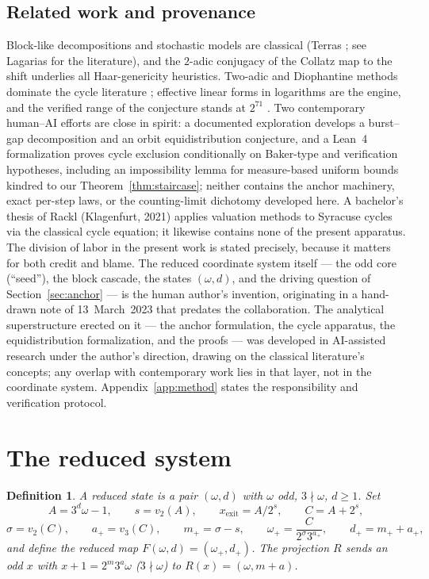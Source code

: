 \documentclass[11pt]{article}
\newtheorem{definition}[theorem]{Definition}
\theoremstyle{remark}
\newcommand{\vt}[1]{v_2\!\left(#1\right)}
\newcommand{\vth}[1]{v_3\!\left(#1\right)}
\newcommand{\w}{\omega}
\newcommand{\wnext}{\w_{+}}
\newcommand{\dnext}{d_{+}}
\begin{document}
\subsection*{Related work and provenance}
Block-like decompositions and stochastic models are classical (Terras \cite{terras}; see Lagarias \cite{lagarias} for the literature), and the $2$-adic conjugacy of the Collatz map to the shift underlies all Haar-genericity heuristics. Two-adic and Diophantine methods dominate the cycle literature \cite{steiner,sdw,hercher,eliahou}; effective linear forms in logarithms \cite{yu,bl,rhin} are the engine, and the verified range of the conjecture stands at $2^{71}$ \cite{barina}. Two contemporary human--AI efforts are close in spirit: a documented exploration \cite{llmcollatz} develops a burst--gap decomposition and an orbit equidistribution conjecture, and a Lean~4 formalization \cite{merle} proves cycle exclusion conditionally on Baker-type and verification hypotheses, including an impossibility lemma for measure-based uniform bounds kindred to our Theorem~\ref{thm:staircase}; neither contains the anchor machinery, exact per-step laws, or the counting-limit dichotomy developed here. A bachelor's thesis of Rackl (Klagenfurt, 2021) applies valuation methods to Syracuse cycles via the classical cycle equation; it likewise contains none of the present apparatus. The division of labor in the present work is stated precisely, because it matters for both credit and blame. The reduced coordinate system itself --- the odd core (``seed''), the block cascade, the states $(\w,d)$, and the driving question of Section~\ref{sec:anchor} --- is the human author's invention, originating in a hand-drawn note of 13~March~2023 that predates the collaboration. The analytical superstructure erected on it --- the anchor formulation, the cycle apparatus, the equidistribution formalization, and the proofs --- was developed in AI-assisted research under the author's direction, drawing on the classical literature's concepts; any overlap with contemporary work lies in that layer, not in the coordinate system. Appendix~\ref{app:method} states the responsibility and verification protocol.

\section{The reduced system}\label{sec:reduced}

\begin{definition}\label{def:reduced}
A \emph{reduced state} is a pair $(\w, d)$ with $\w$ odd, $3\nmid\w$, $d \ge 1$. Set
\[ A = 3^d\w - 1,\qquad s = \vt{A},\qquad x_{\mathrm{exit}} = A/2^s,\qquad C = A + 2^s, \]
\[ \sigma = \vt{C},\qquad a_+ = \vth{C},\qquad m_+ = \sigma - s,\qquad \wnext = \frac{C}{2^{\sigma}3^{a_+}},\qquad \dnext = m_+ + a_+, \]
and define the \emph{reduced map} $F(\w,d) = (\wnext, \dnext)$. The \emph{projection} $R$ sends an odd $x$ with $x + 1 = 2^m 3^a \w$ ($3\nmid\w$) to $R(x) = (\w, m + a)$.
\end{definition}
\end{document}
